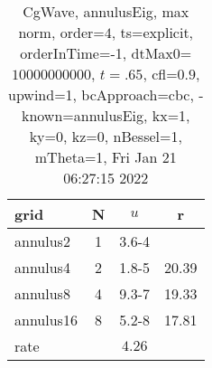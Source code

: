 \begin{table}[H]\tableFont %
\begin{center}
\begin{tabular}{|l|c|c|c|} \hline 
grid  & N &  $ u $ & r \\ \hline 
  annulus2 &     1 & \num{3.6}{-4} &        \\ \hline
  annulus4 &     2 & \num{1.8}{-5} & 20.39  \\ \hline
  annulus8 &     4 & \num{9.3}{-7} & 19.33  \\ \hline
 annulus16 &     8 & \num{5.2}{-8} & 17.81  \\ \hline
    rate             &       &  $4.26$       &       \\ \hline
\end{tabular}
\caption{CgWave, annulusEig, max norm, order=$4$, ts=explicit, orderInTime=-1, dtMax0=$10000000000$, $t=.65$, cfl=$0.9$, upwind=1, bcApproach=cbc, -known=annulusEig, kx=1, ky=0, kz=0, nBessel=1, mTheta=1, Fri Jan 21 06:27:15 2022}\label{table:annulusEigOrder4max}
\end{center}
\end{table}
